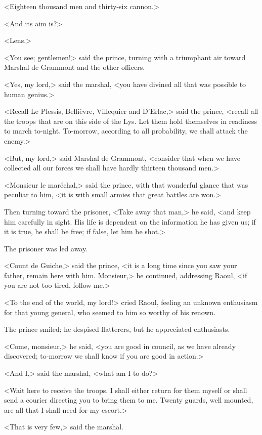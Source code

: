<Eighteen thousand men and thirty-six cannon.>

<And its aim is?>

<Lens.>

<You see; gentlemen!> said the prince, turning with a triumphant air toward Marshal de Grammont and the other officers.

<Yes, my lord,> said the marshal, <you have divined all that was possible to human genius.>

<Recall Le Plessis, Bellièvre, Villequier and D'Erlac,> said the prince, <recall all the troops that are on this side of the Lys. Let them hold themselves in readiness to march to-night. To-morrow, according to all probability, we shall attack the enemy.>

<But, my lord,> said Marshal de Grammont, <consider that when we have collected all our forces we shall have hardly thirteen thousand men.>

<Monsieur le maréchal,> said the prince, with that wonderful glance that was peculiar to him, <it is with small armies that great battles are won.>

Then turning toward the prisoner, <Take away that man,> he said, <and keep him carefully in sight. His life is dependent on the information he has given us; if it is true, he shall be free; if false, let him be shot.>

The prisoner was led away.

<Count de Guiche,> said the prince, <it is a long time since you saw your father, remain here with him. Monsieur,> he continued, addressing Raoul, <if you are not too tired, follow me.>

<To the end of the world, my lord!> cried Raoul, feeling an unknown enthusiasm for that young general, who seemed to him so worthy of his renown.

The prince smiled; he despised flatterers, but he appreciated enthusiasts.

<Come, monsieur,> he said, <you are good in council, as we have already discovered; to-morrow we shall know if you are good in action.>

<And I,> said the marshal, <what am I to do?>

<Wait here to receive the troops. I shall either return for them myself or shall send a courier directing you to bring them to me. Twenty guards, well mounted, are all that I shall need for my escort.>

<That is very few,> said the marshal.

